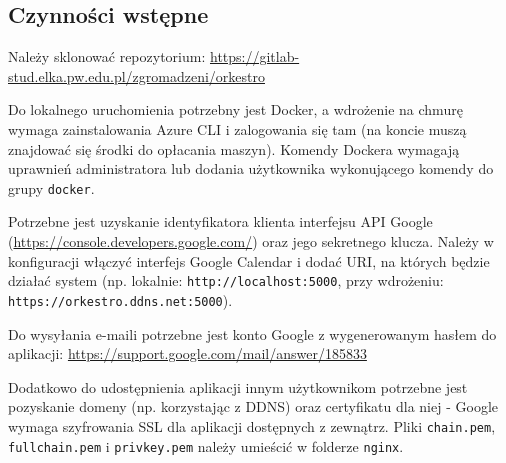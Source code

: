 \documentclass[11pt,a4paper]{article}
\renewcommand{\_}{\char`_}
\begin{document}
\subsection{Czynności wstępne}

Należy sklonować repozytorium: \url{https://gitlab-stud.elka.pw.edu.pl/zgromadzeni/orkestro}

Do lokalnego uruchomienia potrzebny jest Docker, a wdrożenie na chmurę wymaga zainstalowania Azure CLI i zalogowania się tam (na koncie muszą znajdować się środki do opłacania maszyn). Komendy Dockera wymagają uprawnień administratora lub dodania użytkownika wykonującego komendy do grupy \texttt{docker}.

Potrzebne jest uzyskanie identyfikatora klienta interfejsu API Google (\url{https://console.developers.google.com/}) oraz jego sekretnego klucza. Należy w konfiguracji włączyć interfejs Google Calendar i dodać URI, na których będzie działać system (np. lokalnie: \texttt{http://localhost:5000}, przy wdrożeniu: \texttt{https://orkestro.ddns.net:5000}).

Do wysyłania e-maili potrzebne jest konto Google z wygenerowanym hasłem do aplikacji: \url{https://support.google.com/mail/answer/185833}

Dodatkowo do udostępnienia aplikacji innym użytkownikom potrzebne jest pozyskanie domeny (np. korzystając z DDNS) oraz certyfikatu dla niej - Google wymaga szyfrowania SSL dla aplikacji dostępnych z zewnątrz. Pliki \texttt{chain.pem}, \texttt{fullchain.pem} i \texttt{privkey.pem} należy umieścić w folderze \texttt{nginx}.
\end{document}
